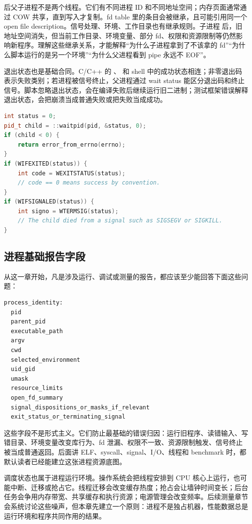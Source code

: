  后父子进程不是两个线程。它们有不同进程 ID 和不同地址空间；内存页面通常通过 COW 共享，直到写入才复制。fd table 里的条目会被继承，且可能引用同一个 open file description。信号处理、环境、工作目录也有继承规则。子进程  后，旧地址空间消失，但当前工作目录、环境变量、部分 fd、权限和资源限制等仍然影响新程序。理解这些继承关系，才能解释“为什么子进程拿到了不该拿的 fd”“为什么脚本运行的是另一个环境”“为什么父进程看到 pipe 永远不 EOF”。

退出状态也是基础合同。C/C++ 的 、 和 shell 中的成功状态相连；非零退出码表示失败类别；若进程被信号终止，父进程通过 wait status 能区分退出码和终止信号。脚本忽略退出状态，会在编译失败后继续运行旧二进制；测试框架错误解释退出状态，会把崩溃当成普通失败或把失败当成成功。

\begin{lstlisting}[language=C++,caption={父进程必须解释 wait status}]
int status = 0;
pid_t child = ::waitpid(pid, &status, 0);
if (child < 0) {
    return error_from_errno(errno);
}
if (WIFEXITED(status)) {
    int code = WEXITSTATUS(status);
    // code == 0 means success by convention.
}
if (WIFSIGNALED(status)) {
    int signo = WTERMSIG(status);
    // The child died from a signal such as SIGSEGV or SIGKILL.
}
\end{lstlisting}

\subsection{进程基础报告字段}

从这一章开始，凡是涉及运行、调试或测量的报告，都应该至少能回答下面这些问题：

\begin{lstlisting}[numbers=none,caption={进程基础报告字段}]
process_identity:
  pid
  parent_pid
  executable_path
  argv
  cwd
  selected_environment
  uid_gid
  umask
  resource_limits
  open_fd_summary
  signal_dispositions_or_masks_if_relevant
  exit_status_or_terminating_signal
\end{lstlisting}

这些字段不是形式主义。它们防止最基础的错误归因：运行旧程序、读错输入、写错目录、环境变量改变库行为、fd 泄漏、权限不一致、资源限制触发、信号终止被当成普通返回。后面讲 ELF、syscall、signal、I/O、线程和 benchmark 时，都默认读者已经能建立这张进程资源底图。

调度状态也属于进程运行环境。操作系统会把线程安排到 CPU 核心上运行，也可能中断、迁移或抢占它。线程迁移会改变缓存热度；抢占会让墙钟时间变长；后台任务会争用内存带宽、共享缓存和执行资源；电源管理会改变频率。后续测量章节会系统讨论这些噪声，但本章先建立一个原则：进程不是独占机器，性能数据总是运行环境和程序共同作用的结果。

